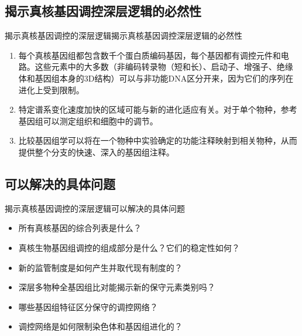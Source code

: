 \documentclass{beamer}
\begin{document}
	\subsection*{揭示真核基因调控深层逻辑的必然性}
	\begin{frame}{揭示真核基因调控的深层逻辑}{揭示真核基因调控深层逻辑的必然性}
		\begin{enumerate}
			\item 每个真核基因组都包含数千个蛋白质编码基因，每个基因都有调控元件和电路。这些元素中的大多数（非编码转录物（短和长）、启动子、增强子、绝缘体和基因组本身的3D结构）可以与非功能DNA区分开来，因为它们的序列在进化上受到限制。
			\item 特定谱系变化速度加快的区域可能与新的进化适应有关。对于单个物种，参考基因组可以测定组织和细胞中的调节。
			\item 比较基因组学可以将在一个物种中实验确定的功能注释映射到相关物种，从而提供整个分支的快速、深入的基因组注释。
		\end{enumerate}
	\end{frame}

	

	\subsection*{可以解决的具体问题}
	\begin{frame}{揭示真核基因调控的深层逻辑}{可以解决的具体问题}
		\begin{itemize}
			\item 所有真核基因的综合列表是什么？
			\item 真核生物基因组调控的组成部分是什么？它们的稳定性如何？
			\item 新的监管制度是如何产生并取代现有制度的？
			\item 深层多物种全基因组比对能揭示新的保守元素类别吗？
			\item 哪些基因组特征区分保守的调控网络？
			\item 调控网络是如何限制染色体和基因组进化的？
		\end{itemize}
	\end{frame}

\end{document}
